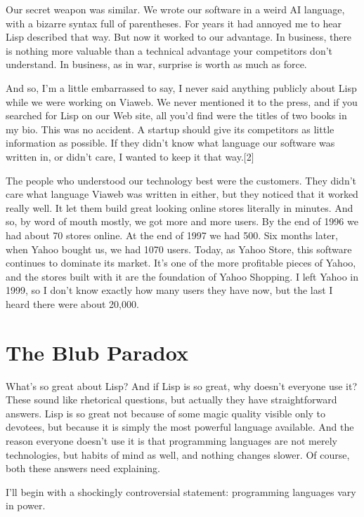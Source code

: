 \documentclass[10pt,twoside,openright]{memoir}
\begin{document}
Our secret weapon was similar. We wrote our software in a weird AI language, with a bizarre syntax full of parentheses. For years it had annoyed me to hear Lisp described that way. But now it worked to our advantage. In business, there is nothing more valuable than a technical advantage your competitors don't understand. In business, as in war, surprise is worth as much as force.

And so, I'm a little embarrassed to say, I never said anything publicly about Lisp while we were working on Viaweb. We never mentioned it to the press, and if you searched for Lisp on our Web site, all you'd find were the titles of two books in my bio. This was no accident. A startup should give its competitors as little information as possible. If they didn't know what language our software was written in, or didn't care, I wanted to keep it that way.[2]

The people who understood our technology best were the customers. They didn't care what language Viaweb was written in either, but they noticed that it worked really well. It let them build great looking online stores literally in minutes. And so, by word of mouth mostly, we got more and more users. By the end of 1996 we had about 70 stores online. At the end of 1997 we had 500. Six months later, when Yahoo bought us, we had 1070 users. Today, as Yahoo Store, this software continues to dominate its market. It's one of the more profitable pieces of Yahoo, and the stores built with it are the foundation of Yahoo Shopping. I left Yahoo in 1999, so I don't know exactly how many users they have now, but the last I heard there were about 20,000.

\section{The Blub Paradox}

What's so great about Lisp? And if Lisp is so great, why doesn't everyone use it? These sound like rhetorical questions, but actually they have straightforward answers. Lisp is so great not because of some magic quality visible only to devotees, but because it is simply the most powerful language available. And the reason everyone doesn't use it is that programming languages are not merely technologies, but habits of mind as well, and nothing changes slower. Of course, both these answers need explaining.

I'll begin with a shockingly controversial statement: programming languages vary in power.
\end{document}
